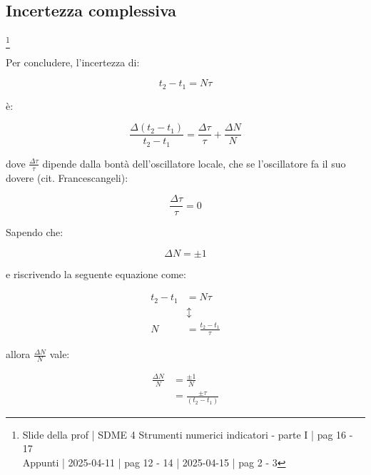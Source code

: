 \newpage 

\subsection{Incertezza complessiva}
\footnote{Slide della prof | SDME 4 Strumenti numerici indicatori - parte I | pag 16 - 17 \\  
Appunti | 2025-04-11 | pag 12 - 14 | 2025-04-15 | pag 2 - 3}

Per concludere, l'incertezza di: 

{
    \Large 
    \begin{equation}
        t_2 - t_1 = N \tau
    \end{equation}
} 

è: 

{
    \Large 
    \begin{equation}
        \frac{\Delta (t_2 - t_1)}{t_2 - t_1}
        = 
        \frac{\Delta \tau}{\tau} 
        + 
        \frac{\Delta N}{N}
    \end{equation}
}

dove $\frac{\Delta \tau}{\tau} $ dipende dalla bontà dell'oscillatore locale, 
che se l'oscillatore fa il suo dovere (cit. Francescangeli): 

{
    \Large 
    \begin{equation}
        \frac{\Delta \tau}{\tau} = 0
    \end{equation}
}

Sapendo che: 

{
    \Large 
    \begin{equation}
        \Delta N = \pm 1
    \end{equation}
}

e riscrivendo la seguente equazione come: 

{
    \Large 
    \begin{equation}
        \begin{split}
        t_2 - t_1 &= N \tau 
        \\
        &\updownarrow
        \\ 
        N &= \frac{t_2 - t_1}{\tau} 
        \end{split}
    \end{equation}
} 

allora $\frac{\Delta N}{N}$ vale: 

{
    \Large
    \begin{equation}
        \begin{split}
            \frac{\Delta N}{N} 
            &=
            \frac{\pm 1}{N}
            \\
            &= 
            \frac{\pm \tau}{(t_2 - t_1)}
        \end{split}
    \end{equation}
}


